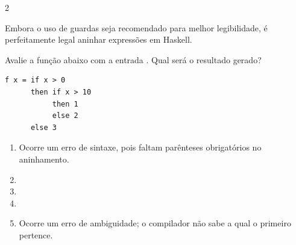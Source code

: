 \documentclass[a4paper,10pt,brazil]{article}
\begin{document}
\begin{multicols}{2}
\begin{enumerate}
\end{enumerate}

Embora o uso de guardas seja recomendado para melhor legibilidade, é perfeitamente legal aninhar expressões  em Haskell. 

Avalie a função abaixo com a entrada . Qual será o resultado gerado?
\begin{verbatim}
f x = if x > 0
      then if x > 10
           then 1
           else 2
      else 3
\end{verbatim}

\begin{enumerate}
  \item Ocorre um erro de sintaxe, pois faltam parênteses obrigatórios no aninhamento.

  \item {}

  \item {}

  \item {}

  \item Ocorre um erro de ambiguidade; o compilador não sabe a qual  o primeiro  pertence.


\end{enumerate}


\end{multicols}
\end{document}
